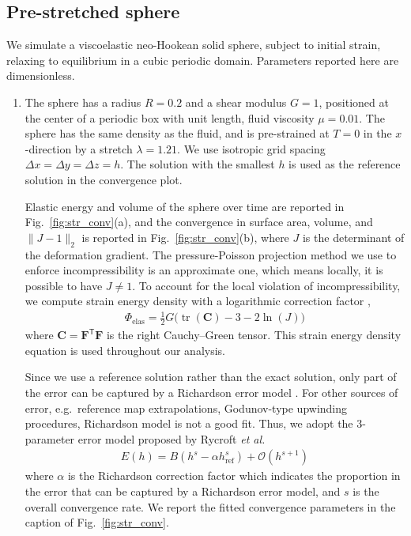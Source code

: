 \documentclass[times, 10pt]{article}
\renewcommand{\vec}[1]{\mathbf{#1}}
\newcommand{\vF}{\vec{F}}
\newcommand{\vC}{\vec{C}}
\newcommand{\trans}{\mathsf{T}}
\DeclareMathOperator{\Tr}{tr}
\begin{document}
	\subsection{Pre-stretched sphere}  We simulate a viscoelastic neo-Hookean solid sphere, subject to initial strain, relaxing to equilibrium in a cubic periodic domain.
	Parameters reported here are dimensionless.


	\begin{enumerate}
		\item The sphere has a radius $R=0.2$ and a shear modulus $G=1$, positioned at the center of a periodic box with unit length, fluid viscosity $\mu = 0.01$.
		The sphere has the same density as the fluid, and is pre-strained at $T=0$ in the $x$-direction by a stretch $\lambda=1.21$.
		We use isotropic grid spacing $\Delta x = \Delta y = \Delta z = h$.
		The solution with the smallest $h$ is used as the reference solution in the convergence plot.

		\qquad Elastic energy and volume of the sphere over time are reported in Fig.~\ref{fig:str_conv}(a),
		and the convergence in surface area, volume, and $\|J-1\|_2$ is reported in Fig.~\ref{fig:str_conv}(b), where
		$J$ is the determinant of the deformation gradient.
		The pressure-Poisson projection method we use to enforce incompressibility is an approximate one,
		which means locally, it is possible to have $J \ne 1$.
        To account for the local violation of incompressibility, we compute strain energy density with a logarithmic correction factor \cite{flory53},
		\begin{align}
		\label{eq:elas}
		\Phi_\text{elas} = \frac12 G\big (\Tr(\vC) - 3 - 2\ln(J) \big)
		\end{align}
		where $\vC=\vF^\trans \vF$ is the right Cauchy--Green tensor.
		This strain energy density equation is used throughout our analysis.

		\qquad Since we use a reference solution rather than the exact solution,
		only part of the error can be captured by a Richardson error model \cite{richardson11, hairer93, heath02, rycroft20}.
		For other sources of error, e.g.~reference map extrapolations, Godunov-type upwinding procedures, Richardson model is not a good fit.
		Thus, we adopt the 3-parameter error model proposed by Rycroft \textit{et al.}~\cite{rycroft20}
		\begin{align}
		\label{eq:3params}
		E(h) = B(h^s - \alpha h_\text{ref}^s) + \mathcal{O}(h^{s+1})
		\end{align}
		where $\alpha$ is the Richardson correction factor which indicates the proportion in the error that can be captured by a Richardson error model, and $s$ is the overall convergence rate.
		We report the fitted convergence parameters in the caption of Fig.~\ref{fig:str_conv}.


\end{enumerate}
\end{document}
